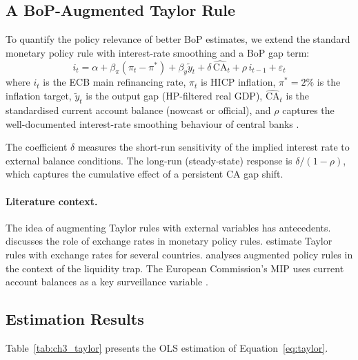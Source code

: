\subsection{A BoP-Augmented Taylor Rule}

To quantify the policy relevance of better BoP estimates, we extend the standard \citet{taylor1993discretion} monetary policy rule with interest-rate smoothing and a BoP gap term:
\begin{equation}
\label{eq:taylor}
  i_t = \alpha + \beta_\pi (\pi_t - \pi^*) + \beta_y \tilde{y}_t + \delta\, \widehat{\text{CA}}_t + \rho\, i_{t-1} + \varepsilon_t
\end{equation}
where $i_t$ is the ECB main refinancing rate, $\pi_t$ is HICP inflation, $\pi^* = 2\%$ is the inflation target, $\tilde{y}_t$ is the output gap (HP-filtered real GDP), $\widehat{\text{CA}}_t$ is the standardised current account balance (nowcast or official), and $\rho$ captures the well-documented interest-rate smoothing behaviour of central banks \citep{woodford2003interest}.

The coefficient $\delta$ measures the short-run sensitivity of the implied interest rate to external balance conditions.  The long-run (steady-state) response is $\delta / (1 - \rho)$, which captures the cumulative effect of a persistent CA gap shift.

\paragraph{Literature context.}
The idea of augmenting Taylor rules with external variables has antecedents.  \citet{taylor2001role} discusses the role of exchange rates in monetary policy rules.  \citet{lubik2007central} estimate Taylor rules with exchange rates for several countries.  \citet{svensson2003wrong} analyses augmented policy rules in the context of the liquidity trap.  The European Commission's MIP uses current account balances as a key surveillance variable \citep{eu2016mip}.

\subsection{Estimation Results}

Table~\ref{tab:ch3_taylor} presents the OLS estimation of Equation~\eqref{eq:taylor}.


